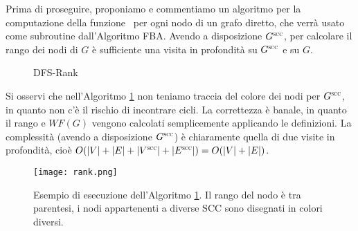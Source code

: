Prima di proseguire, proponiamo e commentiamo un algoritmo per la computazione della funzione \rankfunc \, per ogni nodo di un grafo diretto, che verrà usato come subroutine dall'Algoritmo FBA. Avendo a disposizione $G^{\superscc}$, per calcolare il rango dei nodi di $G$ è sufficiente una visita in profondità su $G^{\superscc}$ e su $G$.
\begin{figure}[H]
    \begin{algorithm}[H]
        \label{alg:rank1}
        \caption{DFS-Rank}
        \SetAlgoLined
    \end{algorithm}
\end{figure}

Si osservi che nell'Algoritmo \ref{alg:rank1} non teniamo traccia del colore dei nodi per $G^{\superscc}$, in quanto non c'è il rischio di incontrare cicli. La correttezza è banale, in quanto il rango e $WF(G)$ vengono calcolati semplicemente applicando le definizioni. La complessità (avendo a disposizione $G^{\superscc}$) è chiaramente quella di due visite in profondità, cioè $O(|V| + |E| + |V^{\superscc}| + |E^{\superscc}|) = O(|V| + |E|)$.
\begin{figure}[H]
    \hspace*{-0.8cm}
    \centering
    \texttt{[image: rank.png]}
    \caption{Esempio di esecuzione dell'Algoritmo \ref{alg:rank1}. Il rango del nodo è tra parentesi, i nodi appartenenti a diverse SCC sono disegnati in colori diversi.}
\end{figure}

